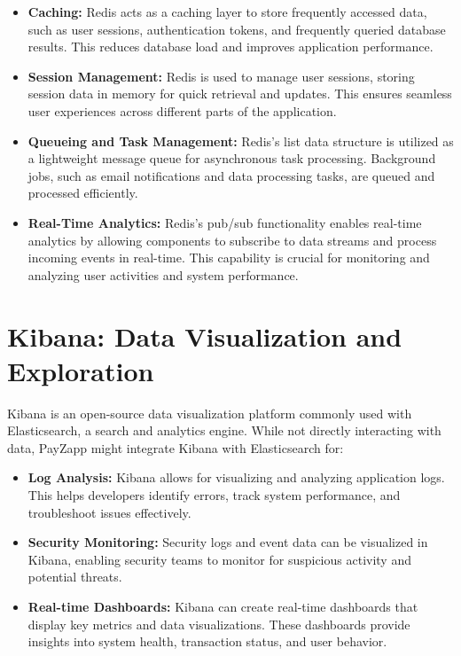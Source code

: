 \documentclass[12pt,a4paper]{report}
\begin{document}
\begin{itemize}
    \item \textbf{Caching:} Redis acts as a caching layer to store frequently accessed data, such as user sessions, authentication tokens, and frequently queried database results. This reduces database load and improves application performance.
    
    \item \textbf{Session Management:} Redis is used to manage user sessions, storing session data in memory for quick retrieval and updates. This ensures seamless user experiences across different parts of the application.
    
    \item \textbf{Queueing and Task Management:} Redis's list data structure is utilized as a lightweight message queue for asynchronous task processing. Background jobs, such as email notifications and data processing tasks, are queued and processed efficiently.
    
    \item \textbf{Real-Time Analytics:} Redis's pub/sub functionality enables real-time analytics by allowing components to subscribe to data streams and process incoming events in real-time. This capability is crucial for monitoring and analyzing user activities and system performance.
\end{itemize}

\section{Kibana: Data Visualization and Exploration}

Kibana is an open-source data visualization platform commonly used with Elasticsearch, a search and analytics engine. While not directly interacting with data, PayZapp might integrate Kibana with Elasticsearch for:

\begin{itemize}
    \item \textbf{Log Analysis:} Kibana allows for visualizing and analyzing application logs. This helps developers identify errors, track system performance, and troubleshoot issues effectively.
    
    \item \textbf{Security Monitoring:} Security logs and event data can be visualized in Kibana, enabling security teams to monitor for suspicious activity and potential threats.
    
    \item \textbf{Real-time Dashboards:} Kibana can create real-time dashboards that display key metrics and data visualizations. These dashboards provide insights into system health, transaction status, and user behavior.
\end{itemize}
\end{document}
